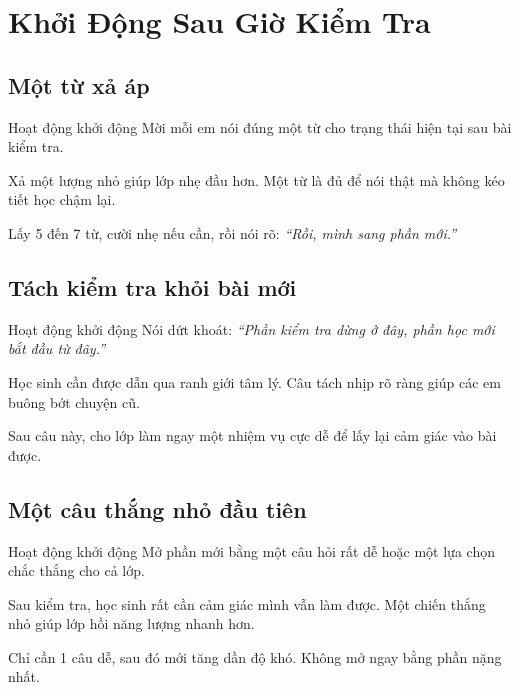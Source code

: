 \chapter{Khởi Động Sau Giờ Kiểm Tra}

\section{Một từ xả áp}
\begin{khoidongbox}{Hoạt động khởi động}
Mời mỗi em nói đúng một từ cho trạng thái hiện tại sau bài kiểm tra.
\end{khoidongbox}
\begin{visaohieuqua}
Xả một lượng nhỏ giúp lớp nhẹ đầu hơn. Một từ là đủ để nói thật mà không kéo tiết học chậm lại.
\end{visaohieuqua}
\begin{cachlam5phut}
Lấy 5 đến 7 từ, cười nhẹ nếu cần, rồi nói rõ: \textit{``Rồi, mình sang phần mới.''}
\end{cachlam5phut}
\ngancach

\section{Tách kiểm tra khỏi bài mới}
\begin{khoidongbox}{Hoạt động khởi động}
Nói dứt khoát: \textit{``Phần kiểm tra dừng ở đây, phần học mới bắt đầu từ đây.''}
\end{khoidongbox}
\begin{visaohieuqua}
Học sinh cần được dẫn qua ranh giới tâm lý. Câu tách nhịp rõ ràng giúp các em buông bớt chuyện cũ.
\end{visaohieuqua}
\begin{cachlam5phut}
Sau câu này, cho lớp làm ngay một nhiệm vụ cực dễ để lấy lại cảm giác vào bài được.
\end{cachlam5phut}
\ngancach

\section{Một câu thắng nhỏ đầu tiên}
\begin{khoidongbox}{Hoạt động khởi động}
Mở phần mới bằng một câu hỏi rất dễ hoặc một lựa chọn chắc thắng cho cả lớp.
\end{khoidongbox}
\begin{visaohieuqua}
Sau kiểm tra, học sinh rất cần cảm giác mình vẫn làm được. Một chiến thắng nhỏ giúp lớp hồi năng lượng nhanh hơn.
\end{visaohieuqua}
\begin{cachlam5phut}
Chỉ cần 1 câu dễ, sau đó mới tăng dần độ khó. Không mở ngay bằng phần nặng nhất.
\end{cachlam5phut}
\ngancach

